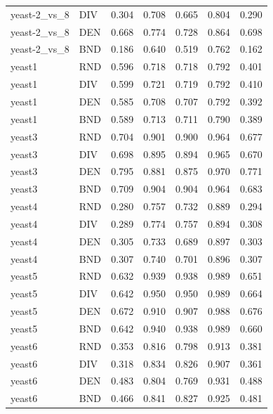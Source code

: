 \documentclass[10pt,a4paper]{article}
\begin{document}
\begin{longtable}{lllllrr}
yeast-2\_vs\_8 & DIV & 0.304 & 0.708 & 0.665 & 0.804 & 0.290 \\
yeast-2\_vs\_8 & DEN & 0.668 & 0.774 & 0.728 & 0.864 & 0.698 \\
yeast-2\_vs\_8 & BND & 0.186 & 0.640 & 0.519 & 0.762 & 0.162 \\
yeast1 & RND & 0.596 & 0.718 & 0.718 & 0.792 & 0.401 \\
yeast1 & DIV & 0.599 & 0.721 & 0.719 & 0.792 & 0.410 \\
yeast1 & DEN & 0.585 & 0.708 & 0.707 & 0.792 & 0.392 \\
yeast1 & BND & 0.589 & 0.713 & 0.711 & 0.790 & 0.389 \\
yeast3 & RND & 0.704 & 0.901 & 0.900 & 0.964 & 0.677 \\
yeast3 & DIV & 0.698 & 0.895 & 0.894 & 0.965 & 0.670 \\
yeast3 & DEN & 0.795 & 0.881 & 0.875 & 0.970 & 0.771 \\
yeast3 & BND & 0.709 & 0.904 & 0.904 & 0.964 & 0.683 \\
yeast4 & RND & 0.280 & 0.757 & 0.732 & 0.889 & 0.294 \\
yeast4 & DIV & 0.289 & 0.774 & 0.757 & 0.894 & 0.308 \\
yeast4 & DEN & 0.305 & 0.733 & 0.689 & 0.897 & 0.303 \\
yeast4 & BND & 0.307 & 0.740 & 0.701 & 0.896 & 0.307 \\
yeast5 & RND & 0.632 & 0.939 & 0.938 & 0.989 & 0.651 \\
yeast5 & DIV & 0.642 & 0.950 & 0.950 & 0.989 & 0.664 \\
yeast5 & DEN & 0.672 & 0.910 & 0.907 & 0.988 & 0.676 \\
yeast5 & BND & 0.642 & 0.940 & 0.938 & 0.989 & 0.660 \\
yeast6 & RND & 0.353 & 0.816 & 0.798 & 0.913 & 0.381 \\
yeast6 & DIV & 0.318 & 0.834 & 0.826 & 0.907 & 0.361 \\
yeast6 & DEN & 0.483 & 0.804 & 0.769 & 0.931 & 0.488 \\
yeast6 & BND & 0.466 & 0.841 & 0.827 & 0.925 & 0.481 \\
\end{longtable}
\endgroup
\clearpage
\end{document}
